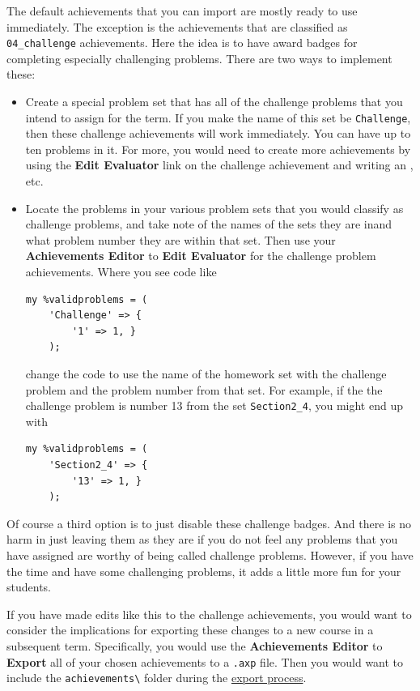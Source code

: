 \documentclass[12pt]{article}
\newcommand{\menu}[1]{\textbf{#1}}
\begin{document}
The default achievements that you can import are mostly ready to use immediately.
The exception is the achievements that are classified as \verb=04_challenge= achievements.
Here the idea is to have award badges for completing especially challenging problems.
There are two ways to implement these: \begin{itemize}
	\item Create a special problem set that has all of the challenge problems that you intend to assign for the term.
	      If you make the name of this set be \texttt{Challenge}, then these challenge achievements will work immediately.
	      You can have up to ten problems in it.
	      For more, you would need to create more achievements by using the \menu{Edit Evaluator} link on the  challenge achievement and writing an , etc.
	\item Locate the problems in your various problem sets that you would classify as challenge problems, and take note of the names of the sets they are inand what problem number they are within that set.
	      Then use your \menu{Achievements Editor} to \menu{Edit Evaluator} for the challenge problem achievements.
	      Where you see code like \begin{verbatim}
my %validproblems = (
	'Challenge' => {
	    '1' => 1, }
	);
	\end{verbatim} change the code to use the name of the homework set with the challenge problem and the problem number from that set.
	      For example, if the the challenge problem is number 13 from the set \verb=Section2_4=, you might end up with \begin{verbatim}
my %validproblems = (
	'Section2_4' => {
	    '13' => 1, }
	);
	\end{verbatim} \end{itemize}

Of course a third option is to just disable these challenge badges.
And there is no harm in just leaving them as they are if you do not feel any problems that you have assigned are worthy of being called challenge problems.
However, if you have the time and have some challenging problems, it adds a little more fun for your students.

If you have made edits like this to the challenge achievements, you would want to consider the implications for exporting these changes to a new course in a subsequent term.
Specifically, you would use the \menu{Achievements Editor} to \menu{Export} all of your chosen achievements to a \texttt{.axp} file.
Then you would want to include the \texttt{achievements\textbackslash} folder during the \hyperref[exp]{export process}.
\end{document}
